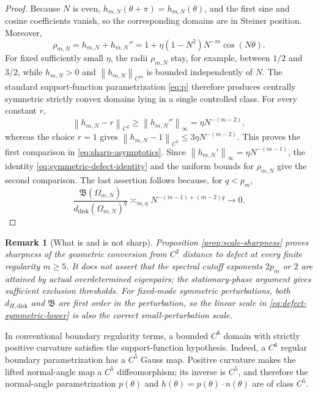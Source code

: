 \documentclass[12pt]{article}
\numberwithin{equation}{section}
\newtheorem{remark}[theorem]{Remark}
\numberwithin{equation}{section}
\begin{document}
\begin{proof}
Because $N$ is even, $h_{m,N}(\theta+\pi)=h_{m,N}(\theta)$, and the first sine and
cosine coefficients vanish, so the corresponding domains are in Steiner
position. Moreover,
\[
 \rho_{m,N}=h_{m,N}+h_{m,N}''
 =1+\eta(1-N^2)N^{-m}\cos(N\theta).
\]
For fixed sufficiently small $\eta$, the radii $\rho_{m,N}$ stay, for example,
between $1/2$ and $3/2$, while $h_{m,N}>0$ and
$\left\|h_{m,N}\right\|_{C^m}$ is bounded
independently of $N$. The standard support-function parametrization
\eqref{eq:p} therefore produces centrally symmetric strictly convex domains
lying in a single controlled class. For every
constant $r$,
\[
 \left\|h_{m,N}-r\right\|_{C^2}\geq\left\|h_{m,N}''\right\|_\infty
 =\eta N^{-(m-2)},
\]
whereas the choice $r=1$ gives
$\left\|h_{m,N}-1\right\|_{C^2}\leq3\eta N^{-(m-2)}$. This proves the first comparison in
\eqref{eq:sharp-asymptotics}. Since
$\left\|h_{m,N}'\right\|_\infty=\eta N^{-(m-1)}$, the identity
\eqref{eq:symmetric-defect-identity} and the uniform bounds for $\rho_{m,N}$
give the second comparison. The last assertion follows because, for
$q<p_m$,
\[
 \frac{\mathfrak B\left(\Omega_{m,N}\right)}{d_{\mathrm{disk}}\left(\Omega_{m,N}\right)^q}
 \asymp_{m,\eta}N^{-(m-1)+(m-2)q}\longrightarrow0.
\]
\end{proof}
\begin{remark}[What is and is not sharp]\label{rem:sharp-scope}
\emph{Proposition \ref{prop:scale-sharpness} proves sharpness of the geometric
conversion from $C^2$ distance to defect at every finite regularity
$m\geq5$. It does not assert that the spectral cutoff exponents $2p_m$ or
$2$ are attained by actual
overdetermined eigenpairs; the stationary-phase argument gives sufficient
exclusion thresholds. For fixed-mode symmetric perturbations, both
$d_{H,{\mathrm{disk}}}$ and $\mathfrak B$ are first order in the perturbation,
so the linear scale in \eqref{eq:defect-symmetric-lower} is also the correct
small-perturbation scale.}
\end{remark}

In conventional boundary regularity terms, a bounded $C^6$ domain with
strictly positive curvature satisfies the support-function hypothesis. Indeed, a $C^6$ regular boundary parametrization has a $C^5$
Gauss map. Positive curvature makes the lifted normal-angle map a $C^5$
diffeomorphism; its inverse is $C^5$, and therefore the normal-angle
parametrization $p(\theta)$ and
$h(\theta)=p(\theta)\cdot n(\theta)$ are of class $C^5$.
\end{document}
